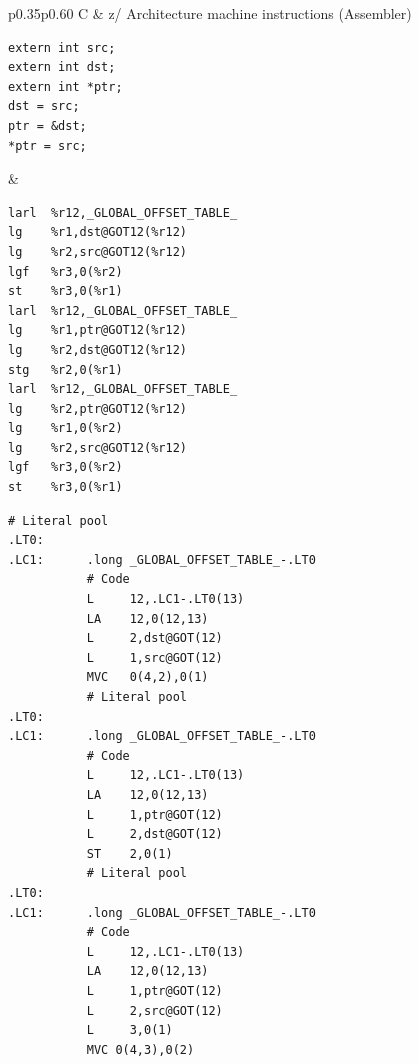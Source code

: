 \documentclass[USenglish,fontsize=11pt,twoside,%
  toc=bib,toc=idx,toc=graduated,numbers=noendperiod,
  bookmarks=true,
  bookmarksnumbered=true,
  bookmarksopen=true,
  bookmarksopenlevel=1,
  breaklinks=true,
  colorlinks=true,
  linkcolor=black,
  pdfpagelayout={TwoPageRight},
  pdfusetitle=true
]{scrreprt}
\newcommand{\ARCH}{z/\kern-1pt Ar\-chi\-tec\-ture}
\newcommand{\ARCH}{ESA/390}
\newenvironment{DIFnomarkup}{}{} %
\begin{document}
\begin{table}
  \centering
  \begin{DIFnomarkup}
  \begin{tabular}{p{}p{}}
    \toprule
    C & \ARCH{} machine instructions (Assembler) \\
    \midrule
\begin{lstlisting}[style=short]
extern int src;
extern int dst;
extern int *ptr;
dst = src;
ptr = &dst;
*ptr = src;
\end{lstlisting}
    &
\ifzseries
\begin{lstlisting}[style=short,language=simpleasm]
larl  %r12,_GLOBAL_OFFSET_TABLE_
lg    %r1,dst@GOT12(%r12)
lg    %r2,src@GOT12(%r12)
lgf   %r3,0(%r2)
st    %r3,0(%r1)
larl  %r12,_GLOBAL_OFFSET_TABLE_
lg    %r1,ptr@GOT12(%r12)
lg    %r2,dst@GOT12(%r12)
stg   %r2,0(%r1)
larl  %r12,_GLOBAL_OFFSET_TABLE_
lg    %r2,ptr@GOT12(%r12)
lg    %r1,0(%r2)
lg    %r2,src@GOT12(%r12)
lgf   %r3,0(%r2)
st    %r3,0(%r1)
\end{lstlisting}
\else
\begin{lstlisting}[style=short,language=simpleasm]
           # Literal pool
.LT0:
.LC1:      .long _GLOBAL_OFFSET_TABLE_-.LT0
           # Code
           L     12,.LC1-.LT0(13)
           LA    12,0(12,13)
           L     2,dst@GOT(12)
           L     1,src@GOT(12)
           MVC   0(4,2),0(1)
           # Literal pool
.LT0:
.LC1:      .long _GLOBAL_OFFSET_TABLE_-.LT0
           # Code
           L     12,.LC1-.LT0(13)
           LA    12,0(12,13)
           L     1,ptr@GOT(12)
           L     2,dst@GOT(12)
           ST    2,0(1)
           # Literal pool
.LT0:
.LC1:      .long _GLOBAL_OFFSET_TABLE_-.LT0
           # Code
           L     12,.LC1-.LT0(13)
           LA    12,0(12,13)
           L     1,ptr@GOT(12)
           L     2,src@GOT(12)
           L     3,0(1)
           MVC 0(4,3),0(2)
\end{lstlisting}
\fi \\
    \bottomrule
  \end{tabular}
  \end{DIFnomarkup}
  \caption{Small model position-independent addressing}
\end{table}
\end{document}

